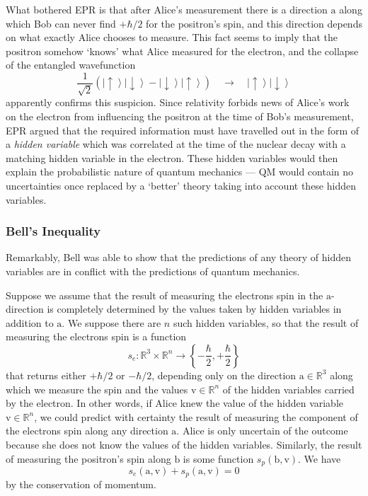 \documentclass{article}
\theoremstyle{plain}\theoremheaderfont{\normalfont\itshape}\theorembodyfont{\rmfamily}\theoremseparator{.}\newtheorem*{rem}{Remark}\newtheorem*{ex}{Example}\newtheorem*{proof}{Proof}\newtheorem*{altp}{Alternative proof}
\theoremstyle{plain}\theoremheaderfont{\normalfont\bfseries}\theorembodyfont{\rmfamily}\theoremseparator{.}\newtheorem{thm}{Theorem}[section]\newtheorem{lem}[thm]{Lemma}\newtheorem{prop}[thm]{Proposition}\newtheorem*{cor}{Corollary}\newtheorem{defn}[thm]{Definition}\newtheorem{clm}[thm]{Claim}\newtheorem{clminproof}{Claim}
\theoremstyle{break}\theoremheaderfont{\normalfont\itshape}\theorembodyfont{\rmfamily}\theoremseparator{.\medskip}\newtheorem*{proofskip}{Proof}\newtheorem*{exs}{Examples}\newtheorem*{rems}{Remarks}
\theoremstyle{break}\theoremheaderfont{\normalfont\bfseries}\theorembodyfont{\rmfamily}\theoremseparator{.\medskip}\newtheorem{lemskip}[thm]{Lemma}\newtheorem{defnskip}[thm]{Definition}\newtheorem{propskip}[thm]{Proposition}\newtheorem{thmskip}[thm]{Theorem}
\numberwithin{equation}{section}
\newcommand{\ket}[1]{\left| #1 \right\rangle}
\newcommand{\vb}[1]{\bm{\mathrm{#1}}}
\newcommand{\RR}{\mathbb{R}}
\begin{document}
    What bothered EPR is that after Alice's measurement there is a direction \(\vb{a}\) along which Bob can never find \(+\hbar/2\) for the positron's spin, and this direction depends on what exactly Alice chooses to measure. This fact seems to imply that the positron somehow `knows' what Alice measured for the electron, and the collapse of the entangled wavefunction
    \begin{equation}
        \frac{1}{\sqrt{2}}\left(\ket{\uparrow}\ket{\downarrow}-\ket{\downarrow}\ket{\uparrow}\right)\quad\longrightarrow\quad\ket{\uparrow}\ket{\downarrow}
    \end{equation}
    apparently confirms this suspicion. Since relativity forbids news of Alice's work on the electron from influencing the positron at the time of Bob's measurement, EPR argued that the required information must have travelled out in the form of a \textit{hidden variable} which was correlated at the time of the nuclear decay with a matching hidden variable in the electron. These hidden variables would then explain the probabilistic nature of quantum mechanics --- QM would contain no uncertainties once replaced by a `better' theory taking into account these hidden variables.

    \subsubsection{Bell's Inequality}
    Remarkably, Bell was able to show that the predictions of any theory of hidden variables are in conflict with the predictions of quantum mechanics.

    Suppose we assume that the result of measuring the electrons spin in the \(\vb{a}\)-direction is completely determined by the values taken by hidden variables in addition to \(\vb{a}\). We suppose there are \(n\) such hidden variables, so that the result of measuring the electrons spin is a function
    \begin{equation}
        s_e:\RR^3\times\RR^n\longrightarrow\left\{-\frac{\hbar}{2},+\frac{\hbar}{2}\right\}
    \end{equation}
    that returns either \(+\hbar/2\) or \(-\hbar/2\), depending only on the direction \(\vb{a}\in\RR^3\) along which we measure the spin and the values \(\vb{v}\in\RR^n\) of the hidden variables carried by the electron. In other words, if Alice knew the value of the hidden variable \(\vb{v}\in\RR^n\), we could predict with certainty the result of measuring the component of the electrons spin along any direction \(\vb{a}\). Alice is only uncertain of the outcome because she does not know the values of the hidden variables. Similarly, the result of measuring the positron's spin along \(\vb{b}\) is some function \(s_p(\vb{b},\vb{v})\). We have
    \begin{equation}
        s_e(\vb{a},\vb{v})+s_p(\vb{a},\vb{v})=0
    \end{equation}
    by the conservation of momentum.
\end{document}
